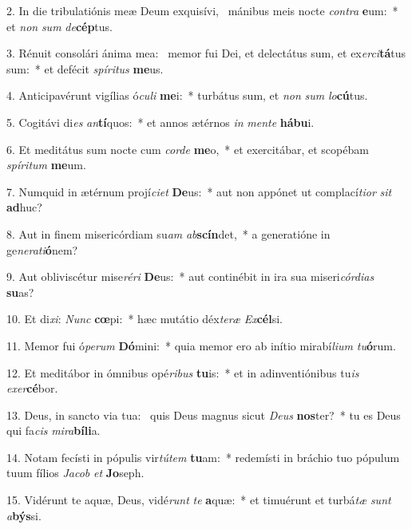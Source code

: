 2. In die tribulatiónis meæ Deum exquisívi, \dag\  mánibus meis nocte \textit{con}\textit{tra} \textbf{e}um:~*  et \textit{non} \textit{sum} \textit{de}\textbf{cép}tus.\

3. Rénuit consolári ánima mea: \dag\  memor fui Dei, et delectátus sum, et ex\textit{er}\textit{ci}\textbf{tá}tus sum:~*  et defécit \textit{spí}\textit{ri}\textit{tus} \textbf{me}us.\

4. Anticipavérunt vigílias ó\textit{cu}\textit{li} \textbf{me}i:~*  turbátus sum, et \textit{non} \textit{sum} \textit{lo}\textbf{cú}tus.\

5. Cogitávi di\textit{es} \textit{an}\textbf{tí}quos:~*  et annos ætérnos \textit{in} \textit{men}\textit{te} \textbf{há}\textbf{bu}i.\

6. Et meditátus sum nocte cum \textit{cor}\textit{de} \textbf{me}o,~*  et exercitábar, et scopébam \textit{spí}\textit{ri}\textit{tum} \textbf{me}um.\

7. Numquid in ætérnum projí\textit{ci}\textit{et} \textbf{De}us:~*  aut non appónet ut complací\textit{ti}\textit{or} \textit{sit} \textbf{ad}huc?\

8. Aut in finem misericórdiam su\textit{am} \textit{ab}\textbf{scín}det,~*  a generatióne in ge\textit{ne}\textit{ra}\textit{ti}\textbf{ó}nem?\

9. Aut obliviscétur mise\textit{ré}\textit{ri} \textbf{De}us:~*  aut continébit in ira sua miseri\textit{cór}\textit{di}\textit{as} \textbf{su}as?\

10. Et di\textit{xi}: \textit{Nunc} \textbf{cœ}pi:~*  hæc mutátio déx\textit{te}\textit{ræ} \textit{Ex}\textbf{cél}si.\

11. Memor fui ó\textit{pe}\textit{rum} \textbf{Dó}mini:~*  quia memor ero ab inítio mirabí\textit{li}\textit{um} \textit{tu}\textbf{ó}rum.\

12. Et meditábor in ómnibus opé\textit{ri}\textit{bus} \textbf{tu}is:~*  et in adinventiónibus tu\textit{is} \textit{ex}\textit{er}\textbf{cé}bor.\

13. Deus, in sancto via tua: \dag\  quis Deus magnus sicut \textit{De}\textit{us} \textbf{nos}ter?~*  tu es Deus qui fa\textit{cis} \textit{mi}\textit{ra}\textbf{bí}\textbf{li}a.\

14. Notam fecísti in pópulis vir\textit{tú}\textit{tem} \textbf{tu}am:~*  redemísti in bráchio tuo pópulum tuum fílios \textit{Ja}\textit{cob} \textit{et} \textbf{Jo}seph.\

15. Vidérunt te aquæ, Deus, vidé\textit{runt} \textit{te} \textbf{a}quæ:~*  et timuérunt et turbá\textit{tæ} \textit{sunt} \textit{a}\textbf{býs}si.\

